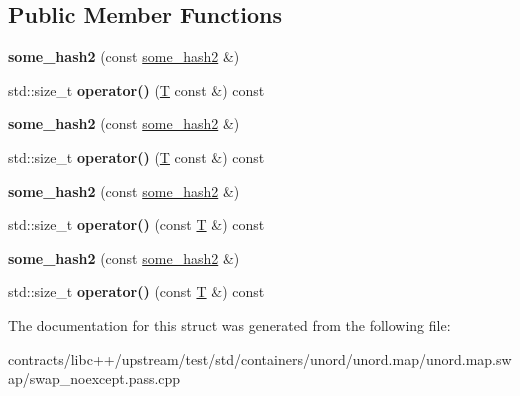 \subsection*{Public Member Functions}
\begin{DoxyCompactItemize}
\item 
\mbox{\label{structsome__hash2_a7e3115057610cf521de874e29419de85}} 
{\bfseries some\+\_\+hash2} (const \mbox{\hyperlink{structsome__hash2}{some\+\_\+hash2}} \&)
\item 
\mbox{\label{structsome__hash2_a3431ec060347b8c8a3c3313ff4549169}} 
std\+::size\+\_\+t {\bfseries operator()} (\mbox{\hyperlink{struct_t}{T}} const \&) const
\item 
\mbox{\label{structsome__hash2_a7e3115057610cf521de874e29419de85}} 
{\bfseries some\+\_\+hash2} (const \mbox{\hyperlink{structsome__hash2}{some\+\_\+hash2}} \&)
\item 
\mbox{\label{structsome__hash2_a3431ec060347b8c8a3c3313ff4549169}} 
std\+::size\+\_\+t {\bfseries operator()} (\mbox{\hyperlink{struct_t}{T}} const \&) const
\item 
\mbox{\label{structsome__hash2_a7e3115057610cf521de874e29419de85}} 
{\bfseries some\+\_\+hash2} (const \mbox{\hyperlink{structsome__hash2}{some\+\_\+hash2}} \&)
\item 
\mbox{\label{structsome__hash2_a60751067ad7d9724c551ad7b0050f88f}} 
std\+::size\+\_\+t {\bfseries operator()} (const \mbox{\hyperlink{struct_t}{T}} \&) const
\item 
\mbox{\label{structsome__hash2_a7e3115057610cf521de874e29419de85}} 
{\bfseries some\+\_\+hash2} (const \mbox{\hyperlink{structsome__hash2}{some\+\_\+hash2}} \&)
\item 
\mbox{\label{structsome__hash2_a60751067ad7d9724c551ad7b0050f88f}} 
std\+::size\+\_\+t {\bfseries operator()} (const \mbox{\hyperlink{struct_t}{T}} \&) const
\end{DoxyCompactItemize}


The documentation for this struct was generated from the following file\+:\begin{DoxyCompactItemize}
\item 
contracts/libc++/upstream/test/std/containers/unord/unord.\+map/unord.\+map.\+swap/swap\+\_\+noexcept.\+pass.\+cpp\end{DoxyCompactItemize}
